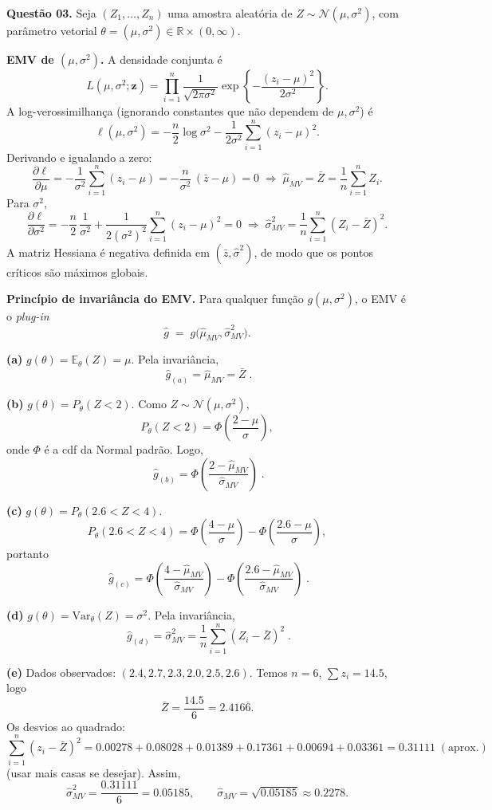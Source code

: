 \textbf{Questão 03.} Seja $(Z_1,\ldots,Z_n)$ uma amostra aleatória de
$Z\sim\mathcal N(\mu,\sigma^2)$, com parâmetro vetorial
$\theta=(\mu,\sigma^2)\in\mathbb R\times(0,\infty)$.

\medskip
\textbf{EMV de $(\mu,\sigma^2)$.}
A densidade conjunta é
\[
L(\mu,\sigma^2;\mathbf z)=
\prod_{i=1}^n \frac{1}{\sqrt{2\pi\sigma^2}}
\exp\!\left\{-\frac{(z_i-\mu)^2}{2\sigma^2}\right\}.
\]
A log-verossimilhança (ignorando constantes que não dependem de $\mu,\sigma^2$) é
\[
\ell(\mu,\sigma^2)
= -\frac{n}{2}\log\sigma^2
  -\frac{1}{2\sigma^2}\sum_{i=1}^n (z_i-\mu)^2 .
\]
Derivando e igualando a zero:
\[
\frac{\partial \ell}{\partial \mu}
= -\frac{1}{\sigma^2}\sum_{i=1}^n (z_i-\mu)
= -\frac{n}{\sigma^2}\,(\bar z-\mu)=0
\;\Longrightarrow\;
\widehat\mu_{MV}=\bar Z=\frac{1}{n}\sum_{i=1}^n Z_i.
\]
Para $\sigma^2$,
\[
\frac{\partial \ell}{\partial \sigma^2}
= -\frac{n}{2}\,\frac{1}{\sigma^2}
  +\frac{1}{2(\sigma^2)^2}\sum_{i=1}^n (z_i-\mu)^2
  =0
\;\Longrightarrow\;
\widehat\sigma^2_{MV}
=\frac{1}{n}\sum_{i=1}^n (Z_i-\bar Z)^2.
\]
A matriz Hessiana é negativa definida em $(\bar z,\widehat\sigma^2)$, de modo que os pontos críticos são máximos globais.

\medskip
\textbf{Princípio de invariância do EMV.}
Para qualquer função $g(\mu,\sigma^2)$, o EMV é o \emph{plug-in}
\[
\widehat g \;=\; g\big(\widehat\mu_{MV},\widehat\sigma^2_{MV}\big).
\]

\bigskip
\textbf{(a) } $g(\theta)=\mathbb E_\theta(Z)=\mu$.
Pela invariância,
\[
\boxed{\;\widehat g_{(a)}=\widehat\mu_{MV}=\bar Z\; }.
\]

\bigskip
\textbf{(b) } $g(\theta)=P_\theta(Z<2)$.
Como $Z\sim\mathcal N(\mu,\sigma^2)$,
\[
P_\theta(Z<2)=\Phi\!\left(\frac{2-\mu}{\sigma}\right),
\]
onde $\Phi$ é a cdf da Normal padrão. Logo,
\[
\boxed{\;\widehat g_{(b)}
=\Phi\!\left(\dfrac{2-\widehat\mu_{MV}}{\widehat\sigma_{MV}}\right)\; }.
\]

\bigskip
\textbf{(c) } $g(\theta)=P_\theta(2.6<Z<4)$.
\[
P_\theta(2.6<Z<4)=
\Phi\!\left(\frac{4-\mu}{\sigma}\right)-
\Phi\!\left(\frac{2.6-\mu}{\sigma}\right),
\]
portanto
\[
\boxed{\;\widehat g_{(c)}
=\Phi\!\left(\dfrac{4-\widehat\mu_{MV}}{\widehat\sigma_{MV}}\right)-
 \Phi\!\left(\dfrac{2.6-\widehat\mu_{MV}}{\widehat\sigma_{MV}}\right)\; }.
\]

\bigskip
\textbf{(d) } $g(\theta)=\mathrm{Var}_\theta(Z)=\sigma^2$.
Pela invariância,
\[
\boxed{\;\widehat g_{(d)}=\widehat\sigma^2_{MV}
=\dfrac{1}{n}\sum_{i=1}^n (Z_i-\bar Z)^2\; }.
\]

\bigskip
\textbf{(e) } Dados observados: $(2.4, 2.7, 2.3, 2.0, 2.5, 2.6)$.
Temos $n=6$, $\sum z_i=14.5$, logo
\[
\bar Z=\frac{14.5}{6}=2.416\overline{6}.
\]
Os desvios ao quadrado:
\[
\sum_{i=1}^n (z_i-\bar Z)^2
=0.00278+0.08028+0.01389+0.17361+0.00694+0.03361
=0.31111\;(\text{aprox.})
\]
(usar mais casas se desejar). Assim,
\[
\widehat\sigma^2_{MV}=\frac{0.31111}{6}=0.05185,\qquad
\widehat\sigma_{MV}=\sqrt{0.05185}\approx 0.2278.
\]

